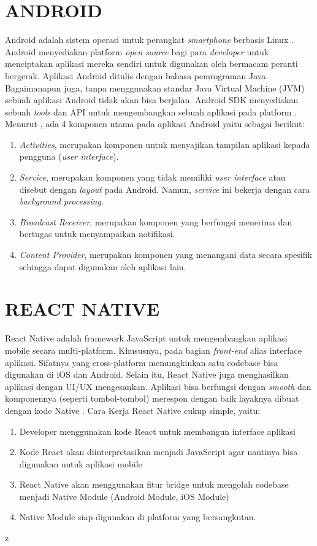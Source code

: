 \section{\uppercase{ANDROID}}
Android adalah sistem operasi untuk perangkat \textit{smartphone} berbasis Linux \citep{Safaat2011}. Android menyediakan platform \textit{open source} bagi para \textit{developer} untuk menciptakan aplikasi mereka sendiri untuk digunakan oleh bermacam peranti bergerak. Aplikasi Android ditulis dengan bahasa pemrograman Java. Bagaimanapun juga, tanpa menggunakan standar Java Virtual Machine (JVM) sebuah aplikasi Android tidak akan bisa berjalan. Android SDK menyediakan sebuah \textit{tools} dan API untuk mengembangkan sebuah aplikasi pada platform \citep{Sarkar2019}. Menurut \cite{Supardi2011}, ada 4 komponen utama pada aplikasi Android yaitu sebagai berikut:
\begin{enumerate}[1.]
	\itemsep0em
	\item \emph{Activities}, merupakan komponen untuk menyajikan tampilan aplikasi kepada pengguna (\textit{user interface}).
	\item \emph{Service}, merupakan komponen yang tidak memiliki \textit{user interface} atau disebut dengan \textit{layout} pada Android. Namun, \textit{service} ini bekerja dengan cara \textit{background processing}.
	\item \emph{Broadcast Receiver}, merupakan komponen yang berfungsi menerima dan bertugas untuk menyampaikan notifikasi.
	\item \emph{Content Provider}, merupakan komponen yang menangani data secara spesifik sehingga dapat digunakan oleh aplikasi lain.
\end{enumerate}

\section{\uppercase{REACT NATIVE}}
React Native adalah framework JavaScript untuk mengembangkan aplikasi mobile secara multi-platform. Khususnya, pada bagian \textit{front-end} alias interface aplikasi. Sifatnya yang cross-platform memungkinkan satu codebase bisa digunakan di iOS dan Android. Selain itu, React Native juga menghasilkan aplikasi dengan UI/UX mengesankan. Aplikasi bisa berfungsi dengan \textit{smooth} dan komponennya (seperti tombol-tombol) merespon dengan baik layaknya dibuat dengan kode Native \citep{Brito2018}. Cara Kerja React Native cukup simple, yaitu:
\begin{enumerate}[1.]
	\itemsep0em
	\item Developer menggunakan kode React untuk membangun interface aplikasi
	\item Kode React akan diinterpretasikan menjadi JavaScript agar nantinya bisa digunakan untuk aplikasi mobile
	\item React Native akan menggunakan fitur bridge untuk mengolah codebase menjadi Native Module (Android Module, iOS Module)
	\item Native Module siap digunakan di platform yang bersangkutan.
\end{enumerate}z

